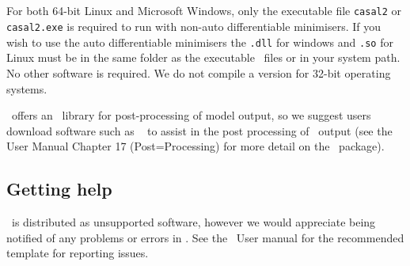 \subsection{}

For both 64-bit Linux and Microsoft Windows, only the executable file \texttt{casal2} or \texttt{casal2.exe} is required to run \CNAME with non-auto differentiable minimisers. If you wish to use the auto differentiable minimisers the \texttt{.dll} for windows and \texttt{.so} for Linux must be in the same folder as the executable \CNAME\ files or in your system path. No other software is required. We do not compile a version for 32-bit operating systems. 

\CNAME\ offers an \R\ library for post-processing of model output, so we suggest users download software such as \href{http://www.r-project.org}{\R}\ \citep{R} to assist in the post processing of \CNAME\ output (see the \CNAME User Manual Chapter 17 (Post=Processing) for more detail on the \R\ package).

\subsection{Getting help}

\CNAME\ is distributed as unsupported software, however we would appreciate being notified of any problems or errors in \CNAME. See the \CNAME\ User manual \citep{CASAL2} for the recommended template for reporting issues.

